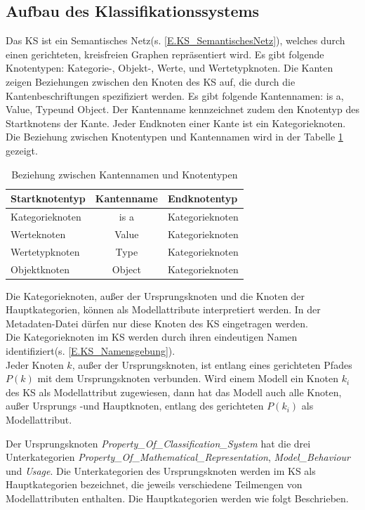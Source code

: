 \subsection{Aufbau des Klassifikationssystems}
\label{Ch:Ergebniss:Sec:KS:SubSec:Aufbau}
Das KS ist ein Semantisches Netz(s. \ref{E.KS_SemantischesNetz}), welches durch einen gerichteten, kreisfreien Graphen repräsentiert wird. Es gibt folgende Knotentypen: Kategorie-, Objekt-, Werte, und Wertetypknoten. 
Die Kanten zeigen Beziehungen zwischen den Knoten des KS auf, die durch die Kantenbeschriftungen spezifiziert werden. Es gibt folgende Kantennamen: \glqq is a\grqq, \glqq Value\grqq, \glqq Type\grqq und \glqq Object\grqq. Der Kantenname kennzeichnet zudem den Knotentyp des Startknotens der Kante. Jeder Endknoten einer Kante ist ein Kategorieknoten. Die Beziehung zwischen Knotentypen und Kantennamen wird in der Tabelle \ref{table:KS_KantenUndKnoten} gezeigt.
\begin{table}[H]
	\centering
	\begin{tabular}{l|c|l}
		Startknotentyp & Kantenname & Endknotentyp \\ \hline
		Kategorieknoten & is a & Kategorieknoten \\
		Werteknoten & Value & Kategorieknoten \\
		Wertetypknoten & Type & Kategorieknoten \\
		Objektknoten & Object & Kategorieknoten
	\end{tabular}
	\caption{Beziehung zwischen Kantennamen und Knotentypen}
	\label{table:KS_KantenUndKnoten}
\end{table}

Die Kategorieknoten, außer der Ursprungsknoten und die Knoten der Hauptkategorien, können als Modellattribute interpretiert werden. In der Metadaten-Datei dürfen nur diese Knoten des KS eingetragen werden. \\
Die Kategorieknoten im KS werden durch ihren eindeutigen Namen identifiziert(s. \ref{E.KS_Namensgebung}).\\
Jeder Knoten $k$, außer der Ursprungsknoten, ist entlang eines gerichteten Pfades $P(k)$ mit dem Ursprungsknoten verbunden. Wird einem Modell ein Knoten $k_i$ des KS als Modellattribut zugewiesen, dann hat das Modell auch alle Knoten, außer Ursprungs -und Hauptknoten, entlang des gerichteten $P(k_i)$ als Modellattribut. %

Der Ursprungsknoten \textit{Property\_Of\_Classification\_System} hat die drei Unterkategorien \textit{Property\_Of\_Mathematical\_Representation}, \textit{Model\_Behaviour} und \textit{Usage}. Die Unterkategorien des Ursprungsknoten werden im KS als Hauptkategorien bezeichnet, die jeweils verschiedene Teilmengen von Modellattributen enthalten. Die Hauptkategorien werden wie folgt Beschrieben.

